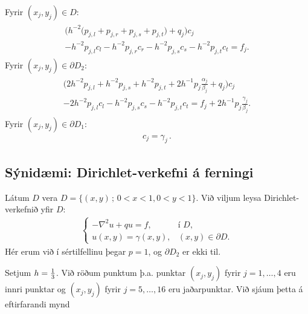 \documentclass[a4paper,10pt,icelandic]{sphinxmanual}
\begin{document}
Fyrir \((x_j, y_j)\in D\):
\begin{equation*}
\begin{split}\begin{gathered}
\big(h^{-2}\big({p_{j,l}+p_{j,r}+p_{j,s}+p_{j,t}}\big)+q_j\big)c_j
\\
-h^{-2}p_{j,l}c_l
-h^{-2}p_{j,r}c_r
-h^{-2}p_{j,s}c_s
-h^{-2}p_{j,t}c_t
=f_j.\end{gathered}\end{split}
\end{equation*}
Fyrir \((x_j, y_j)\in \partial D_2\):
\begin{equation*}
\begin{split}\begin{gathered}
\big(2h^{-2}p_{j,l}+h^{-2}p_{j,s}+h^{-2}p_{j,t}
+2h^{-1}p_j\tfrac{\alpha_j}{\beta_j}+q_j\big)c_j
\\
-2h^{-2}p_{j,l}c_l-h^{-2}p_{j,s}c_s-h^{-2}p_{j,t}c_t
=f_j+2h^{-1}p_j\tfrac{\gamma_j}{\beta_j}.\end{gathered}\end{split}
\end{equation*}
Fyrir \((x_j, y_j)\in \partial D_1\):
\begin{equation*}
\begin{split}c_j= \gamma_j \,.\end{split}
\end{equation*}

\subsection{Sýnidæmi: Dirichlet-verkefni á ferningi}
\label{\detokenize{Kafli05:synidaemi-dirichlet-verkefni-a-ferningi}}
Látum \(D\) vera  \(D=\{(x,y)\,;\, 0<x<1, 0<y<1\}\). Við viljum  leysa Dirichlet-verkefnið yfir \(D\):
\begin{equation*}
\begin{split}\begin{cases}
-\nabla^2u+qu=f,&\text{í } D,\\
u(x,y)=\gamma(x,y),& (x,y)\in \partial D.
\end{cases}\end{split}
\end{equation*}
Hér erum við í sértilfellinu þegar \(p=1\), og \(\partial D_2\) er ekki til.

Setjum \(h={1\over 3}\). Við röðum punktum þ.a. punktar \((x_j,y_j)\) fyrir \(j=1, \dots, 4\) eru innri punktar og \((x_j,y_j)\) fyrir \(j=5,\dots, 16\) eru jaðarpunktar. Við sjáum þetta á eftirfarandi mynd
\end{document}
